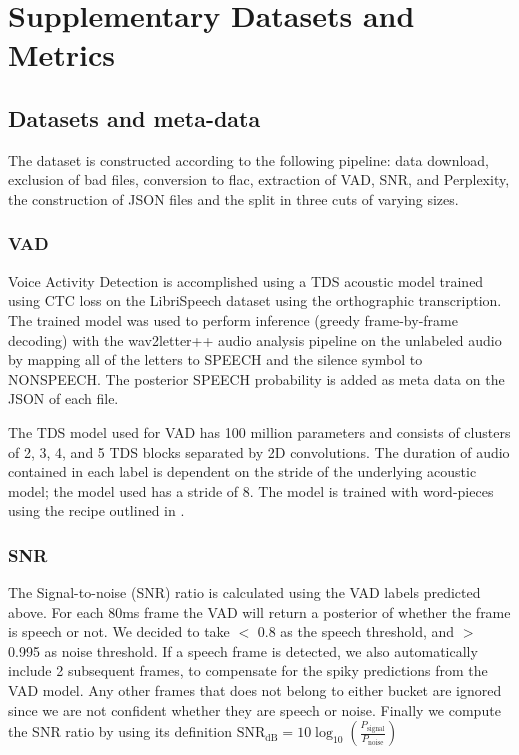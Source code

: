 \documentclass{article}
\begin{document}
\vspace{-5pt}






\setcounter{section}{0}
\setcounter{table}{0}
\setcounter{figure}{0}

\renewcommand\thesection{S\arabic{section}}
\renewcommand\thetable{S\arabic{table}}
\renewcommand\thefigure{S\arabic{figure}}

\section{Supplementary Datasets and Metrics}\label{sec:supmeth}
\subsection{Datasets and meta-data}

The dataset is constructed according to the following pipeline:
data download, exclusion of bad files, conversion to flac, extraction of VAD, SNR, and Perplexity, the construction of JSON files and the split in three cuts of varying sizes.  

\subsubsection{VAD}\label{sec:supvad}
Voice Activity Detection is accomplished using a TDS acoustic model \cite{hannun2019tds} trained using CTC loss \cite{graves2006connectionist} on the LibriSpeech dataset using the orthographic transcription. The trained model was used to perform inference (greedy frame-by-frame decoding) with the wav2letter++\cite{wav2letter++} audio analysis pipeline on the unlabeled audio by mapping all of the letters to \textsc{SPEECH} and the silence symbol to \textsc{NONSPEECH}. The posterior \textsc{SPEECH} probability is added as meta data on the JSON of each file.

The TDS model used for VAD has 100 million parameters and consists of clusters of 2, 3, 4, and 5 TDS blocks separated by 2D convolutions. The duration of audio contained in each label is dependent on the stride of the underlying acoustic model; the model used has a stride of 8. The model is trained with word-pieces using the recipe outlined in \cite{hannun2019tds}. 


\subsubsection{SNR}\label{sec:supsnr}
The Signal-to-noise (SNR) ratio is calculated using the VAD labels predicted above. For each 80ms frame the VAD will return a posterior of whether the frame is speech or not. We decided to take $<$ 0.8 as the speech threshold, and $>$ 0.995 as noise threshold. If a speech frame is detected, we also automatically include 2 subsequent frames, to compensate for the spiky predictions from the VAD model. Any other frames that does not belong to either bucket are ignored since we are not confident whether they are speech or noise. Finally we compute the SNR ratio by using its definition $\mathrm{SNR_{dB}} = 10 \log_{10} \left ( \frac{P_\mathrm{signal}}{P_\mathrm{noise}} \right )$
\end{document}
